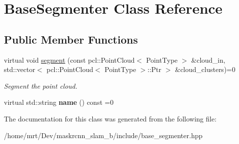 \hypertarget{classBaseSegmenter}{}\section{Base\+Segmenter Class Reference}
\label{classBaseSegmenter}
\subsection*{Public Member Functions}
\begin{DoxyCompactItemize}
\item 
\mbox{\label{classBaseSegmenter_adbb7ea25f30ec103541b24118fc36f36}} 
virtual void \hyperlink{classBaseSegmenter_adbb7ea25f30ec103541b24118fc36f36}{segment} (const pcl\+::\+Point\+Cloud$<$ Point\+Type $>$ \&cloud\+\_\+in, std\+::vector$<$ pcl\+::\+Point\+Cloud$<$ Point\+Type $>$\+::Ptr $>$ \&cloud\+\_\+clusters)=0
\begin{DoxyCompactList}\small\item\em Segment the point cloud. \end{DoxyCompactList}\item 
\mbox{\label{classBaseSegmenter_afd4e2673d8ce2d6ab36ec09dd34aa766}} 
virtual std\+::string {\bfseries name} () const =0
\end{DoxyCompactItemize}


The documentation for this class was generated from the following file\+:\begin{DoxyCompactItemize}
\item 
/home/mrt/\+Dev/maskrcnn\+\_\+slam\+\_\+b/include/base\+\_\+segmenter.\+hpp\end{DoxyCompactItemize}
